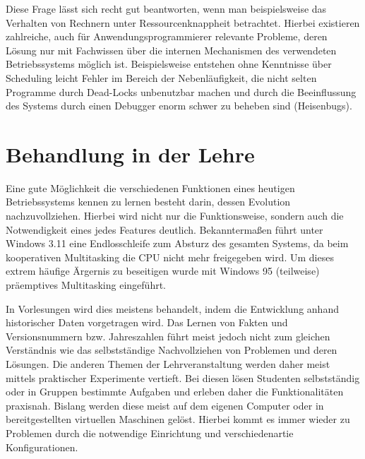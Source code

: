		Diese Frage lässt sich recht gut beantworten, wenn man beispielsweise das Verhalten von Rechnern unter Ressourcenknappheit betrachtet. Hierbei existieren zahlreiche, auch für Anwendungsprogrammierer relevante Probleme, deren Lösung nur mit Fachwissen über die internen Mechanismen des verwendeten Betriebssystems möglich ist. 
		Beispielsweise entstehen ohne Kenntnisse über Scheduling leicht Fehler im Bereich der Nebenläufigkeit, die nicht selten Programme durch Dead-Locks unbenutzbar machen und durch die Beeinflussung des Systems durch einen Debugger enorm schwer zu beheben sind (Heisenbugs).





\section{Behandlung in der Lehre}
\label{sec:teaching}

	Eine gute Möglichkeit die verschiedenen Funktionen eines heutigen Betriebssystems kennen zu lernen besteht darin, dessen Evolution nachzuvollziehen. Hierbei wird nicht nur die Funktionsweise, sondern auch die Notwendigkeit eines jedes Features deutlich. 
	Bekanntermaßen führt unter Windows 3.11 eine Endlosschleife zum Absturz des gesamten Systems, da beim kooperativen Multitasking die CPU nicht mehr freigegeben wird.
	Um dieses extrem häufige Ärgernis zu beseitigen wurde mit Windows 95 (teilweise) präemptives Multitasking eingeführt.

	In Vorlesungen wird dies meistens behandelt, indem  die Entwicklung anhand historischer Daten vorgetragen wird.
	Das Lernen von Fakten und Versionsnummern bzw. Jahreszahlen führt meist jedoch nicht zum gleichen Verständnis wie das selbstständige Nachvollziehen von Problemen und deren Lösungen.
	Die anderen Themen der Lehrveranstaltung werden daher meist mittels praktischer Experimente vertieft.
	Bei diesen lösen Studenten selbstständig oder in Gruppen bestimmte Aufgaben und erleben daher die Funktionalitäten praxisnah.
	Bislang werden diese meist auf dem eigenen Computer oder in bereitgestellten virtuellen Maschinen gelöst.
	Hierbei kommt es immer wieder zu Problemen durch die notwendige Einrichtung und verschiedenartie Konfigurationen.


